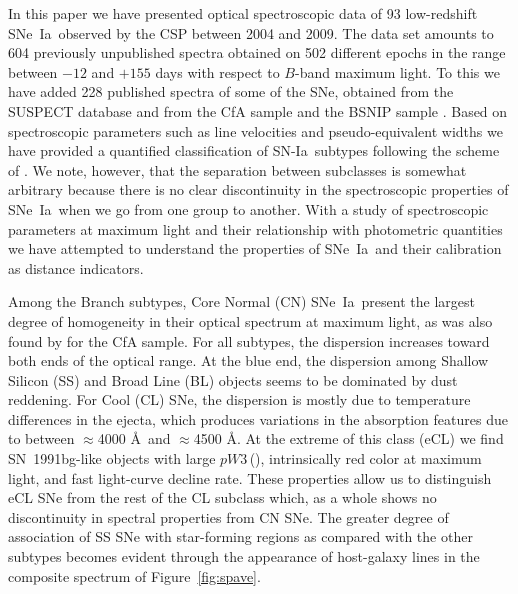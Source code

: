 \documentclass[apj]{emulateapj-rtx4}
\newcommand{\pwthree}{$pW$3\,(\ion{Mg}{2})}
\newcommand{\sndia}{SN-Ia}
\newcommand{\sneia}{SNe~Ia}
\begin{document}
In this paper we have presented optical spectroscopic data of 93
low-redshift \sneia\ observed by the CSP between 2004 and 2009. The
data set amounts to 604 previously unpublished spectra
obtained on 502 different epochs in the range between $-12$
and $+155$ days with respect to $B$-band maximum light. To this we
have added 228 published spectra of 
some of the SNe, obtained from the SUSPECT database and from the CfA
sample \citep{blondin12} and the BSNIP sample \citep{silverman12a}. Based on
spectroscopic parameters such as line velocities and pseudo-equivalent
widths we have provided a quantified classification of \sndia\ subtypes
following the scheme of \citet{branch06}. We note, however, that the
separation between subclasses is somewhat arbitrary because there is
no clear discontinuity in the spectroscopic properties of \sneia\ when
we go from one group to another. With a study of spectroscopic parameters at
maximum light and their relationship with photometric quantities we
have attempted to understand the properties of \sneia\ and their
calibration as distance indicators. 

Among the Branch subtypes, Core Normal (CN) \sneia\ present the
largest degree of homogeneity in their optical spectrum at maximum
light, as was also found by \citet{blondin12} for the CfA sample. For
all subtypes, the dispersion increases toward both ends of the optical
range. At the blue end, the dispersion among Shallow Silicon (SS) and
Broad Line (BL) objects seems to be dominated by dust reddening. For
Cool (CL) SNe, the dispersion is mostly due to temperature
differences in the ejecta, which produces variations in the absorption 
features due to  between $\approx$4000 \AA\ and
$\approx$4500 \AA. At the extreme of this class (eCL) 
we find SN~1991bg-like objects with large \pwthree, intrinsically red
color at maximum light, and fast light-curve decline rate. These
properties allow us to distinguish eCL SNe from the rest of the CL
subclass which, as a whole shows no discontinuity in spectral
properties from CN SNe. The greater degree of association of SS SNe
with star-forming regions as compared with the other subtypes becomes
evident through the appearance of host-galaxy lines in the composite
spectrum of Figure~\ref{fig:spave}. 
\end{document}
